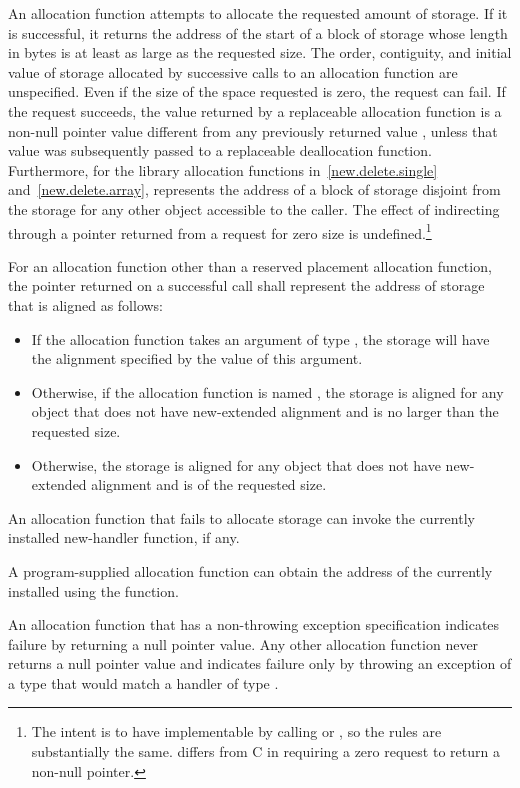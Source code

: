 \pnum
An allocation function attempts to allocate the requested amount of
storage. If it is successful, it returns the address of the start
of a block of storage whose length in bytes is at least as large
as the requested size.
The order,
contiguity, and initial value of storage allocated by successive calls
to an allocation function are unspecified.
Even if the size of the space
requested is zero, the request can fail. If the request succeeds, the
value returned by a replaceable allocation function
is a non-null pointer value
 different from any previously returned value ,
unless that value  was subsequently passed to a
replaceable deallocation function.
Furthermore, for the library allocation functions
in~\ref{new.delete.single} and~\ref{new.delete.array},
 represents the address of a block of storage disjoint from the storage
for any other object accessible to the caller.
The effect of indirecting through a pointer
returned from a request for zero size is undefined.\footnote{The intent is
to have  implementable by
calling  or , so the rules are
substantially the same. \Cpp{} differs from C in requiring a zero request
to return a non-null pointer.}

\pnum
For an allocation function other than
a reserved placement allocation function,
the pointer returned on a successful call
shall represent the address of storage that is aligned as follows:
\begin{itemize}
\item
  If the allocation function takes an argument
  of type ,
  the storage will have the alignment specified
  by the value of this argument.
\item
  Otherwise, if the allocation function is named ,
  the storage is aligned for any object that
  does not have new-extended alignment and
  is no larger than the requested size.
\item
  Otherwise, the storage is aligned for any object that
  does not have new-extended alignment and is of the requested size.
\end{itemize}

\pnum
An allocation function that fails to allocate storage can invoke the
currently installed new-handler function, if any.
\begin{note}
%
A program-supplied allocation function can obtain the address of the
currently installed  using the
 function.
\end{note}
An allocation function that has a non-throwing
exception specification
indicates failure by returning
a null pointer value.
Any other allocation function
never returns a null pointer value and
indicates failure only by throwing an exception of a type
that would match a handler of type
.


